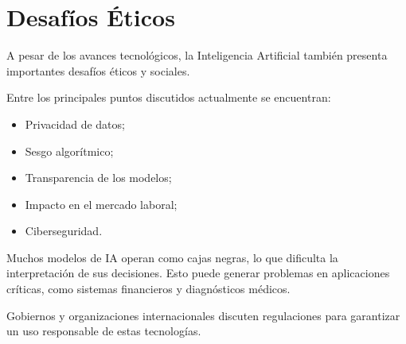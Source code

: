 \section{Desafíos Éticos}

A pesar de los avances tecnológicos, la Inteligencia Artificial también presenta importantes desafíos éticos y
sociales.

Entre los principales puntos discutidos actualmente se encuentran:

\begin{itemize}
    \item Privacidad de datos;
    \item Sesgo algorítmico;
    \item Transparencia de los modelos;
    \item Impacto en el mercado laboral;
    \item Ciberseguridad.
\end{itemize}

Muchos modelos de IA operan como cajas negras, lo que dificulta la interpretación de sus decisiones.
Esto puede generar problemas en aplicaciones críticas, como sistemas financieros y diagnósticos
médicos.

Gobiernos y organizaciones internacionales discuten regulaciones para garantizar un uso
responsable de estas tecnologías. 